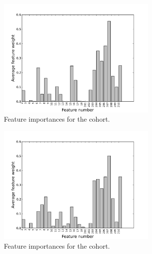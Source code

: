 \begin{paragraph}
\begin{figure}[ht!]
  \caption{Feature importances for the \both cohort.}\label{fig:randomized_logistic_regression_forum_and_wiki}
  \centering
    \includegraphics[width=0.7\textwidth]{figures/logreg/randomized_forum_and_wiki.png}
\end{figure}

\begin{figure}[ht!]
  \caption{Feature importances for the \wiki cohort.}\label{fig:randomized_logistic_regression_wiki_only}
  \centering
    \includegraphics[width=0.7\textwidth]{figures/logreg/randomized_wiki_only.png}
\end{figure}

\end{paragraph}

